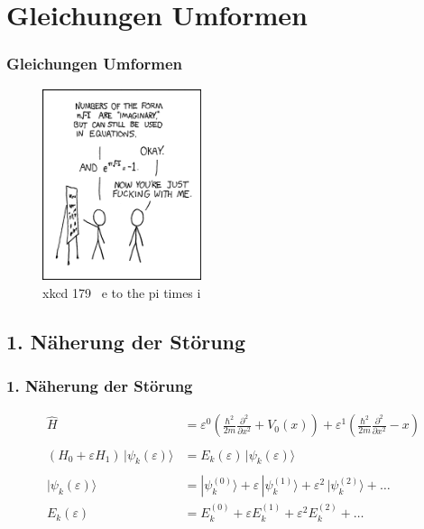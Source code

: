 \documentclass[aspectratio=169]{beamer}
\begin{document}
\section{ Gleichungen Umformen }
\begin{frame}
  \frametitle{ Gleichungen Umformen }
  \begin{figure}
    \centering
    \includegraphics[height=5.6cm]{./179_e_to_the_pi_times_i.png}
    \caption{ xkcd 179 \textendash \ e to the pi times i }
    \label{abb:179_e_to_the_pi_times_i}
  \end{figure}
\end{frame}

\subsection{ 1. N\"aherung der St\"orung }
\begin{frame}
  \frametitle{ 1. N\"aherung der St\"orung }
  \begin{align*}
    \hat{H} &= \varepsilon^0 ( \frac{\hbar^2}{2m} \frac{\partial^2}{\partial x^2} + V_0(x) )
               + \varepsilon^1 ( \frac{\hbar^2}{2m} \frac{\partial^2}{\partial x^2} - x )
  \\
  \\
    (H_0+\varepsilon H_1)\,|\psi_k(\varepsilon)\rangle
    &=
    E_k(\varepsilon)\,|\psi_k(\varepsilon)\rangle
  \\
  \\
    |\psi_k(\varepsilon)\rangle
    &=
    |\psi_k^{(0)}\rangle+\varepsilon\,|\psi_k^{(1)}\rangle
    +\varepsilon^2\,|\psi_k^{(2)}\rangle+\dots
  \\
    E_k(\varepsilon)
    &=
    E_k^{(0)}+\varepsilon E_k^{(1)} + \varepsilon^2 E_k^{(2)}+\dots
  \end{align*}
  
\end{frame}
\end{document}

